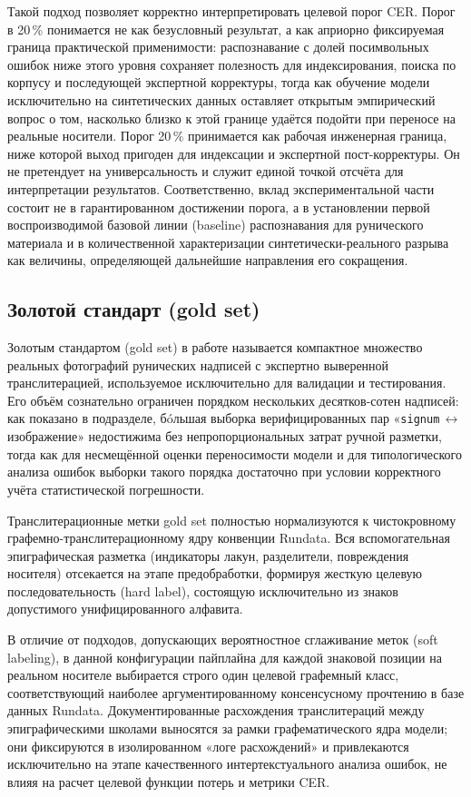 \documentclass[a4paper,12pt]{extarticle}
\begin{document}
Такой подход позволяет корректно интерпретировать целевой порог CER. Порог в 20\,\% понимается не как безусловный результат, а как априорно фиксируемая граница практической применимости: распознавание с долей посимвольных ошибок ниже этого уровня сохраняет полезность для индексирования, поиска по корпусу и последующей экспертной корректуры, тогда как обучение модели исключительно на синтетических данных оставляет открытым эмпирический вопрос о том, насколько близко к этой границе удаётся подойти при переносе на реальные носители. Порог 20\,\% принимается как рабочая инженерная граница, ниже которой выход пригоден для индексации и экспертной пост-корректуры. Он не претендует на универсальность и служит единой точкой отсчёта для интерпретации результатов. Соответственно, вклад экспериментальной части состоит не в гарантированном достижении порога, а в установлении первой воспроизводимой базовой линии (baseline) распознавания для рунического материала и в количественной характеризации синтетически-реального разрыва как величины, определяющей дальнейшие направления его сокращения.
 
\subsection{Золотой стандарт (gold set)}
\label{sec:gold}
 
Золотым стандартом (gold set) в работе называется компактное множество реальных фотографий рунических надписей с экспертно выверенной транслитерацией, используемое исключительно для валидации и тестирования. Его объём сознательно ограничен порядком нескольких десятков-сотен надписей: как показано в подразделе, бóльшая выборка верифицированных пар «\texttt{signum}\,$\leftrightarrow$\,изображение» недостижима без непропорциональных затрат ручной разметки, тогда как для несмещённой оценки переносимости модели и для типологического анализа ошибок выборки такого порядка достаточно при условии корректного учёта статистической погрешности. 
 
Транслитерационные метки gold set полностью нормализуются к чистокровному графемно-транслитерационному ядру конвенции Rundata. Вся вспомогательная эпиграфическая разметка (индикаторы лакун, разделители, повреждения носителя) отсекается на этапе предобработки, формируя жесткую целевую последовательность (hard label), состоящую исключительно из знаков допустимого унифицированного алфавита.

В отличие от подходов, допускающих вероятностное сглаживание меток (soft labeling), в данной конфигурации пайплайна для каждой знаковой позиции на реальном носителе выбирается строго один целевой графемный класс, соответствующий наиболее аргументированному консенсусному прочтению в базе данных Rundata. Документированные расхождения транслитераций между эпиграфическими школами выносятся за рамки графематического ядра модели; они фиксируются в изолированном «логе расхождений» и привлекаются исключительно на этапе качественного интертекстуального анализа ошибок, не влияя на расчет целевой функции потерь и метрики CER.
 
\end{document}
